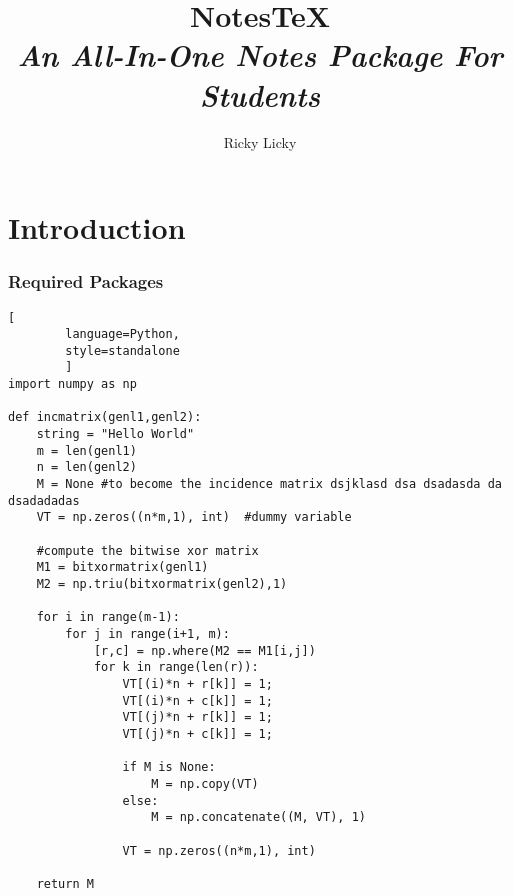 \documentclass[10pt]{article}
\begin{document}
	\title{{Notes\TeX}\\{\normalsize{\itshape An All-In-One Notes Package For Students}}}
	\author{Ricky Licky}
	\maketitle


	\newpage
	\pagestyle{fancynotes}
	\part{Introduction}

	\section{Required Packages}\label{sec:reqpackages}

	\begin{lstlisting}[
		language=Python,
		style=standalone
		]
import numpy as np

def incmatrix(genl1,genl2):
	string = "Hello World"
	m = len(genl1)
	n = len(genl2)
	M = None #to become the incidence matrix dsjklasd dsa dsadasda da dsadadadas
	VT = np.zeros((n*m,1), int)  #dummy variable

	#compute the bitwise xor matrix
	M1 = bitxormatrix(genl1)
	M2 = np.triu(bitxormatrix(genl2),1)

	for i in range(m-1):
		for j in range(i+1, m):
			[r,c] = np.where(M2 == M1[i,j])
			for k in range(len(r)):
				VT[(i)*n + r[k]] = 1;
				VT[(i)*n + c[k]] = 1;
				VT[(j)*n + r[k]] = 1;
				VT[(j)*n + c[k]] = 1;

				if M is None:
					M = np.copy(VT)
				else:
					M = np.concatenate((M, VT), 1)

				VT = np.zeros((n*m,1), int)

	return M

	\end{lstlisting}
\end{document}
